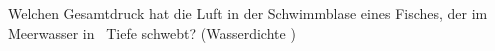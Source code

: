 Welchen Gesamtdruck hat die Luft in der Schwimmblase eines Fisches, der im Meerwasser in \hFO\ Tiefe schwebt? (Wasserdichte \rhoMO)
